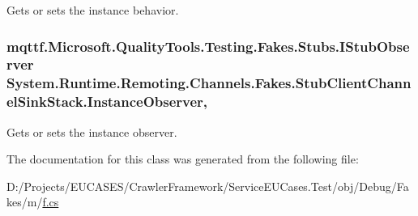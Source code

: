 Gets or sets the instance behavior.

\hypertarget{class_system_1_1_runtime_1_1_remoting_1_1_channels_1_1_fakes_1_1_stub_client_channel_sink_stack_a71ecbfd9d41e0a48d933d96640c804c6}{
\subsubsection[{Instance\-Observer}]{\setlength{\rightskip}{0pt plus 5cm}mqttf.\-Microsoft.\-Quality\-Tools.\-Testing.\-Fakes.\-Stubs.\-I\-Stub\-Observer System.\-Runtime.\-Remoting.\-Channels.\-Fakes.\-Stub\-Client\-Channel\-Sink\-Stack.\-Instance\-Observer\hspace{0.3cm}{\ttfamily [get]}, {\ttfamily [set]}}}\label{class_system_1_1_runtime_1_1_remoting_1_1_channels_1_1_fakes_1_1_stub_client_channel_sink_stack_a71ecbfd9d41e0a48d933d96640c804c6}


Gets or sets the instance observer.



The documentation for this class was generated from the following file\-:\begin{DoxyCompactItemize}
\item 
D\-:/\-Projects/\-E\-U\-C\-A\-S\-E\-S/\-Crawler\-Framework/\-Service\-E\-U\-Cases.\-Test/obj/\-Debug/\-Fakes/m/\hyperlink{m_2f_8cs}{f.\-cs}\end{DoxyCompactItemize}
